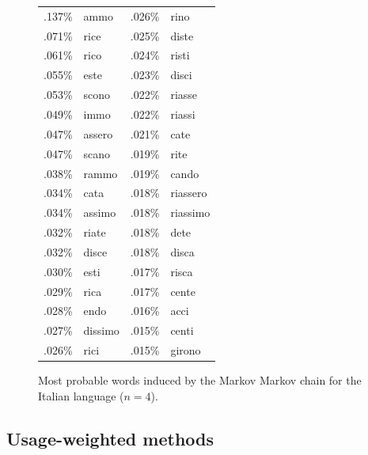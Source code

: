 \documentclass[twocolumn]{article}
\begin{document}
\begin{figure}
\begin{center}
\begin{tabular}{rl@{\quad\quad}rl}
.137\%  &  ammo       &   .026\%  &  rino      \\
.071\%  &  rice       &   .025\%  &  diste     \\
.061\%  &  rico       &   .024\%  &  risti     \\
.055\%  &  este       &   .023\%  &  disci     \\
.053\%  &  scono      &   .022\%  &  riasse    \\
.049\%  &  immo       &   .022\%  &  riassi    \\
.047\%  &  assero     &   .021\%  &  cate      \\
.047\%  &  scano      &   .019\%  &  rite      \\
.038\%  &  rammo      &   .019\%  &  cando     \\
.034\%  &  cata       &   .018\%  &  riassero  \\
.034\%  &  assimo     &   .018\%  &  riassimo  \\
.032\%  &  riate      &   .018\%  &  dete      \\
.032\%  &  disce      &   .018\%  &  disca     \\
.030\%  &  esti       &   .017\%  &  risca     \\
.029\%  &  rica       &   .017\%  &  cente     \\
.028\%  &  endo       &   .016\%  &  acci      \\
.027\%  &  dissimo    &   .015\%  &  centi     \\
.026\%  &  rici       &   .015\%  &  girono    \\
\end{tabular}
\end{center}
\caption{Most probable words induced by the Markov Markov chain for
  the Italian language ($n=4$).}
\label{fig:italian}
\end{figure}


\subsection{Usage-weighted methods}
\end{document}
